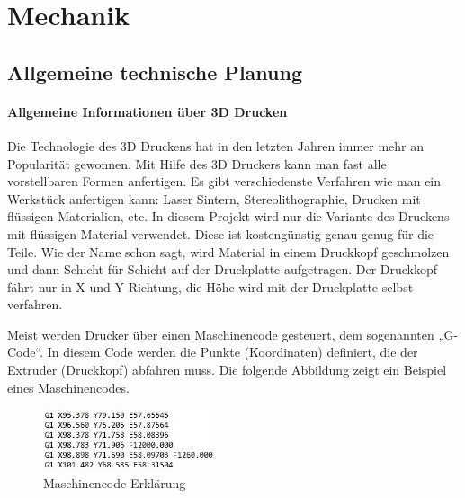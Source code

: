 \chapter{Mechanik}

\renewcommand{\kapitelautor}{Autor: Alexander Punz}

\section{Allgemeine technische Planung}

		\subsubsection{Allgemeine Informationen über 3D Drucken}

		Die Technologie des 3D Druckens hat in den letzten Jahren immer mehr an Popularität gewonnen. Mit Hilfe des 3D Druckers kann man fast alle vorstellbaren Formen anfertigen.
		Es gibt verschiedenste Verfahren wie man ein Werkstück anfertigen kann: Laser Sintern, Stereolithographie, Drucken mit flüssigen Materialien, etc.
		In diesem Projekt wird nur die Variante des Druckens mit flüssigen Material verwendet.
		Diese ist kostengünstig \bzw genau genug für die Teile. Wie der Name schon sagt, wird Material in einem Druckkopf geschmolzen und dann Schicht für Schicht auf der Druckplatte aufgetragen.
		Der Druckkopf fährt nur in X und Y Richtung, die Höhe wird mit der Druckplatte selbst verfahren.

		Meist werden Drucker über einen Maschinencode gesteuert, dem sogenannten „G-Code“. In diesem Code werden die Punkte (Koordinaten) definiert, die der Extruder (Druckkopf) abfahren muss.
		Die folgende Abbildung zeigt ein Beispiel eines Maschinencodes.

			\begin{figure}[tbh]
			\begin{centering}
			\includegraphics[width = 0.45\textwidth]{Bilder/gcode_erklaerung}
			\par\end{centering}
			\caption{Maschinencode Erklärung}
			\label{gcode_erklaerung}
			\end{figure}


